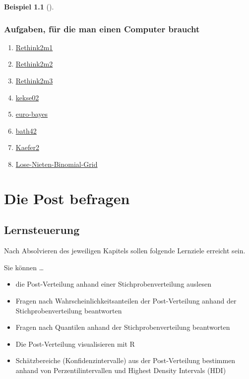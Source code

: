 \documentclass[
  ngerman,
  letterpaper,
  twoside,
  open=any]{scrbook}
\providecommand{\tightlist}{%
  \setlength{\itemsep}{0pt}\setlength{\parskip}{0pt}}\usepackage{longtable,booktabs,array}
\theoremstyle{definition}
\newtheorem{example}{Beispiel}[chapter]
\theoremstyle{plain}
\theoremstyle{definition}
\theoremstyle{definition}
\theoremstyle{remark}
\begin{document}
\begin{example}[]
\subsection{Aufgaben, für die man einen Computer
braucht}\label{aufgaben-fuxfcr-die-man-einen-computer-braucht-4}

\begin{enumerate}
\def\labelenumi{\arabic{enumi}.}
\setcounter{enumi}{1}
\tightlist
\item
  \href{https://datenwerk.netlify.app/posts/Rethink2m1/Rethink2m1.html}{Rethink2m1}
\item
  \href{https://datenwerk.netlify.app/posts/Rethink2m2/Rethink2m2}{Rethink2m2}
\item
  \href{https://datenwerk.netlify.app/posts/Rethink2m3/Rethink2m3}{Rethink2m3}
\item
  \href{https://datenwerk.netlify.app/posts/kekse02/kekse02.html}{kekse02}
\item
  \href{https://datenwerk.netlify.app/posts/euro-bayes/euro-bayes.html}{euro-bayes}
\item
  \href{https://datenwerk.netlify.app/posts/bath42/bath42}{bath42}
\item
  \href{https://datenwerk.netlify.app/posts/kaefer2/kaefer2}{Kaefer2}
\item
  \href{https://datenwerk.netlify.app/posts/lose-nieten-binomial-grid/lose-nieten-binomial-grid}{Lose-Nieten-Binomial-Grid}
\end{enumerate}

\chapter{Die Post befragen}\label{die-post-befragen}

\section{Lernsteuerung}\label{lernsteuerung-6}

Nach Absolvieren des jeweiligen Kapitels sollen folgende Lernziele
erreicht sein.

Sie können \ldots{}

\begin{itemize}
\tightlist
\item
  die Post-Verteilung anhand einer Stichprobenverteilung auslesen
\item
  Fragen nach Wahrscheinlichkeitsanteilen der Post-Verteilung anhand der
  Stichprobenverteilung beantworten
\item
  Fragen nach Quantilen anhand der Stichprobenverteilung beantworten
\item
  Die Post-Verteilung visualisieren mit R
\item
  Schätzbereiche (Konfidenzintervalle) aus der Post-Verteilung bestimmen
  anhand von Perzentilintervallen und Highest Density Intervals (HDI)
\end{itemize}


\end{example}
\end{document}

